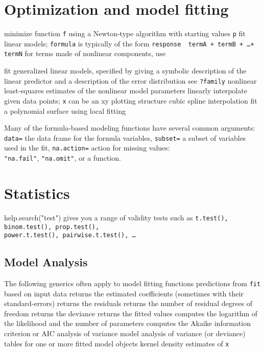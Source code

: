 \section{Optimization and model fitting}{}
	{minimize function {\tt f} using a Newton-type algorithm with
starting values {\tt p}}
	{fit linear models; {\tt formula} is typically of the form
{\tt response \tild\ termA + termB + \ldots + termN}}
	{for terms made of nonlinear components, use}

	{fit generalized linear models, specified by giving
a symbolic description of the linear predictor and a description of the error
distribution}
	{see {\tt ?family}}
	{nonlinear least-squares estimates of the nonlinear model
parameters}
	{linearly interpolate given data points; {\tt x} can be an
xy plotting structure}
	{cubic spline interpolation}
	{fit a polynomial surface using local fitting}

Many of the formula-based modeling functions have several common
arguments: {\tt data=} the data frame for the formula variables,
{\tt subset=} a subset of variables used in the fit,
{\tt na.action=} action for missing values:\\{\tt "na.fail"}, {\tt "na.omit"}, or
a function.

\section{Statistics}{help.search("test") gives you a range of validity tests
such as {\tt t.test(), binom.test(), prop.test(),\\power.t.test(),
pairwise.t.test(), \ldots}}
\subsection{Model Analysis}	{The following generics often apply to model fitting functions}
	{predictions from {\tt fit} based on input data}
	{ returns the estimated coefficients (sometimes with their standard-errors)}
	{ returns the residuals}
	{ returns the number of residual degrees of freedom}
	{ returns the deviance}
	{ returns the fitted values}
	{ computes the logarithm of the likelihood and the number of parameters}
	{ computes the Akaike information criterion or AIC}
	{analysis of variance model}
	{analysis of variance (or deviance) tables for one or more fitted model objects}
	{kernel density estimates of {\tt x}}

